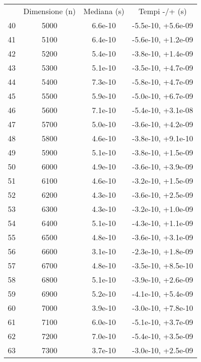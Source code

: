 \begin{table}
\centering
\begin{adjustbox}{width=1\textwidth/2}
\begin{tabular}{|c|c|c|c|}
\hline
 & Dimensione (n) & Mediana (s) & Tempi -/+ (s) \\
40 & 5000 & 6.6e-10 & -5.5e-10, +5.6e-09 \\
\cline{1-4}
41 & 5100 & 6.4e-10 & -5.6e-10, +1.2e-09 \\
\cline{1-4}
42 & 5200 & 5.4e-10 & -3.8e-10, +1.4e-09 \\
\cline{1-4}
43 & 5300 & 5.1e-10 & -3.5e-10, +4.7e-09 \\
\cline{1-4}
44 & 5400 & 7.3e-10 & -5.8e-10, +4.7e-09 \\
\cline{1-4}
45 & 5500 & 5.9e-10 & -5.0e-10, +6.7e-09 \\
\cline{1-4}
46 & 5600 & 7.1e-10 & -5.4e-10, +3.1e-08 \\
\cline{1-4}
47 & 5700 & 5.0e-10 & -3.6e-10, +4.2e-09 \\
\cline{1-4}
48 & 5800 & 4.6e-10 & -3.8e-10, +9.1e-10 \\
\cline{1-4}
49 & 5900 & 5.1e-10 & -3.8e-10, +1.5e-09 \\
\cline{1-4}
50 & 6000 & 4.9e-10 & -3.6e-10, +3.9e-09 \\
\cline{1-4}
51 & 6100 & 4.6e-10 & -3.2e-10, +1.5e-09 \\
\cline{1-4}
52 & 6200 & 4.3e-10 & -3.6e-10, +2.5e-09 \\
\cline{1-4}
53 & 6300 & 4.3e-10 & -3.2e-10, +1.0e-09 \\
\cline{1-4}
54 & 6400 & 5.1e-10 & -4.3e-10, +1.1e-09 \\
\cline{1-4}
55 & 6500 & 4.8e-10 & -3.6e-10, +3.1e-09 \\
\cline{1-4}
56 & 6600 & 3.1e-10 & -2.3e-10, +1.8e-09 \\
\cline{1-4}
57 & 6700 & 4.8e-10 & -3.5e-10, +8.5e-10 \\
\cline{1-4}
58 & 6800 & 5.1e-10 & -3.9e-10, +2.6e-09 \\
\cline{1-4}
59 & 6900 & 5.2e-10 & -4.1e-10, +5.4e-09 \\
\cline{1-4}
60 & 7000 & 3.9e-10 & -3.0e-10, +7.8e-10 \\
\cline{1-4}
61 & 7100 & 6.0e-10 & -5.1e-10, +3.7e-09 \\
\cline{1-4}
62 & 7200 & 7.0e-10 & -5.4e-10, +3.5e-09 \\
\cline{1-4}
63 & 7300 & 3.7e-10 & -3.0e-10, +2.5e-09 \\

\end{tabular}
\end{adjustbox}
\end{table}
